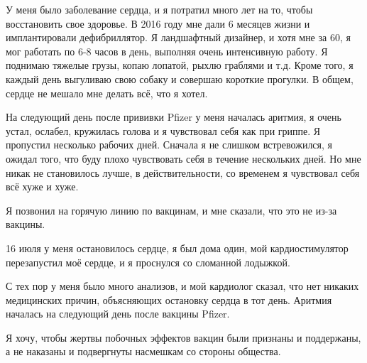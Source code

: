 У меня было заболевание сердца, и я потратил много лет на то, чтобы восстановить
свое здоровье. В 2016 году мне дали 6 месяцев жизни и имплантировали
дефибриллятор. Я ландшафтный дизайнер, и хотя мне за 60, я мог работать по 6-8
часов в день, выполняя очень интенсивную работу. Я поднимаю тяжелые грузы, копаю
лопатой, рыхлю граблями и т.д. Кроме того, я каждый день выгуливаю свою собаку и
совершаю короткие прогулки. В общем, сердце не мешало мне делать всё, что я
хотел.

На следующий день после прививки Pfizer у меня началась аритмия, я очень устал,
ослабел, кружилась голова и я чувствовал себя как при гриппе. Я пропустил
несколько рабочих дней. Сначала я не слишком встревожился, я ожидал того, что
буду плохо чувствовать себя в течение нескольких дней. Но мне никак не
становилось лучше, в действительности, со временем я чувствовал себя всё хуже и
хуже.

Я позвонил на горячую линию по вакцинам, и мне сказали, что это не из-за
вакцины.

16 июля у меня остановилось сердце, я был дома один, мой кардиостимулятор
перезапустил моё сердце, и я проснулся со сломанной лодыжкой.

С тех пор у меня было много анализов, и мой кардиолог сказал, что нет никаких
медицинских причин, объясняющих остановку сердца в тот день. Аритмия началась на
следующий день после вакцины Pfizer.

Я хочу, чтобы жертвы побочных эффектов вакцин были признаны и поддержаны, а не
наказаны и подвергнуты насмешкам со стороны общества.

